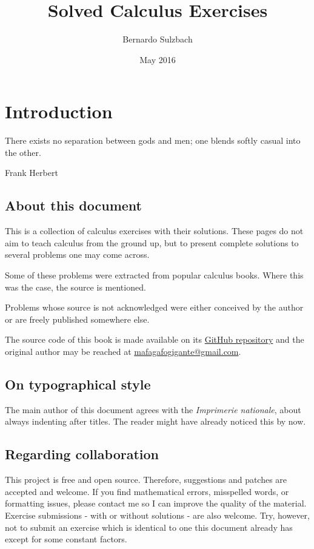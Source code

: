 \documentclass[a4paper, titlepage]{article}
\title{Solved Calculus Exercises}
\author{Bernardo Sulzbach}
\date{May 2016}
\begin{document}
\maketitle

\tableofcontents

\section{Introduction}

\setlength{\epigraphwidth}{3in}
\epigraph{There exists no separation between gods and men; one blends softly
casual into the other.}{Frank Herbert}

\subsection{About this document}

This is a collection of calculus exercises with their solutions. These pages do
not aim to teach calculus from the ground up, but to present complete solutions
to several problems one may come across.

Some of these problems were extracted from popular calculus books.
Where this was the case, the source is mentioned.

Problems whose source is not acknowledged were either conceived by
the author or are freely published somewhere else.

The source code of this book is made available on its
\href{https://github.com/mafagafogigante/solved-calculus-exercises}{GitHub
repository} and the original author may be reached at
\href{mailto:mafagafogigante@gmail.com}{mafagafogigante@gmail.com}.

\subsection{On typographical style}

The main author of this document agrees with the \textit{Imprimerie nationale},
about always indenting after titles. The reader might have already noticed this
by now.

\subsection{Regarding collaboration}

This project is free and open source. Therefore, suggestions and patches are
accepted and welcome. If you find mathematical errors, misspelled words, or
formatting issues, please contact me so I can improve the quality of the
material. Exercise submissions - with or without solutions - are also welcome.
Try, however, not to submit an exercise which is identical to one this document
already has except for some constant factors.
\end{document}
